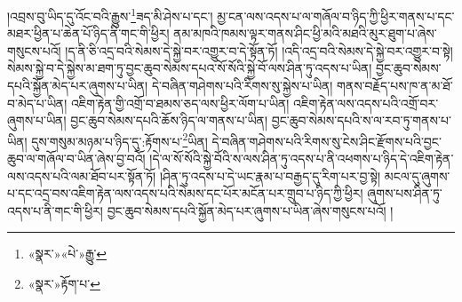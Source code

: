 །འབྲས་བུ་ཡིད་དུ་འོང་བའི་རྒྱུས་\footnote{«སྣར་»«པེ་»རྒྱུ་}ཟད་མི་ཤེས་པ་དང་། མྱ་ངན་ལས་འདས་པ་ལ་གཞོལ་བ་ཉིད་ཀྱི་ཕྱིར་གནས་པ་དང་མཐར་ཕྱིན་པ་ཆེན་པོ་ཉིད་ནི་གང་གི་ཕྱིར། ནམ་མཁའི་ཁམས་ལྟར་གནས་ཤིང་ཕྱི་མའི་མཐའི་མུར་ཐུག་པ་ཞེས་གསུངས་པའོ། །ད་ནི་ཅི་འདྲ་བའི་སེམས་དེ་སྐྱེ་བར་འགྱུར་བ་དེ་སྟོན་ཏོ། །འདི་འདྲ་བའི་སེམས་དེ་སྐྱེ་བར་འགྱུར་བ་སྟེ། སེམས་སྐྱེ་བ་དེ་སྐྱེས་མ་ཐག་ཏུ་བྱང་ཆུབ་སེམས་དཔའ་སོ་སོའི་སྐྱེ་བོ་ལས་ཤིན་ཏུ་འདས་པ་ཡིན། བྱང་ཆུབ་སེམས་དཔའི་སྐྱོན་མེད་པར་ཞུགས་པ་ཡིན། དེ་བཞིན་གཤེགས་པའི་རིགས་སུ་སྐྱེས་པ་ཡིན། གནས་བརྗོད་པས་ཁ་ན་མ་ཐོ་བ་མེད་པ་ཡིན། འཇིག་རྟེན་གྱི་འགྲོ་བ་ཐམས་ཅད་ལས་ཕྱིར་ལོག་པ་ཡིན། འཇིག་རྟེན་ལས་འདས་པའི་འགྲོ་བར་ཞུགས་པ་ཡིན། བྱང་ཆུབ་སེམས་དཔའི་ཆོས་ཉིད་ལ་གནས་པ་ཡིན། བྱང་ཆུབ་སེམས་དཔའི་ས་ལ་རབ་ཏུ་གནས་པ་ཡིན། དུས་གསུམ་མཉམ་པ་ཉིད་དུ་:རྟོགས་པ་\footnote{«སྣར་»རྟོག་པ་}ཡིན། དེ་བཞིན་གཤེགས་པའི་རིགས་སུ་ངེས་ཤིང་རྫོགས་པའི་བྱང་ཆུབ་ལ་གཞོལ་བ་ཡིན་ཞེས་བྱ་བའོ། །དེ་ལ་སོ་སོའི་སྐྱེ་བོའི་ས་ལས་ཤིན་ཏུ་འདས་པ་ནི་འཕགས་པ་ཉིད་དེ་འཇིག་རྟེན་ལས་འདས་པའི་ལམ་ཐོབ་པར་སྟོན་ཏོ། །ཤིན་ཏུ་འདས་པ་དེ་ཡང་རྣམ་པ་བརྒྱད་དུ་རིག་པར་བྱ་སྟེ། མངལ་དུ་ཞུགས་པ་དང་འདྲ་བས་འཇིག་རྟེན་ལས་འདས་པའི་སེམས་དང་པོར་མངོན་པར་གྲུབ་པ་ཉིད་ཀྱི་ཕྱིར། ཞུགས་པས་ཤིན་ཏུ་འདས་པ་ནི་གང་གི་ཕྱིར། བྱང་ཆུབ་སེམས་དཔའི་སྐྱོན་མེད་པར་ཞུགས་པ་ཡིན་ཞེས་གསུངས་པའོ། །
